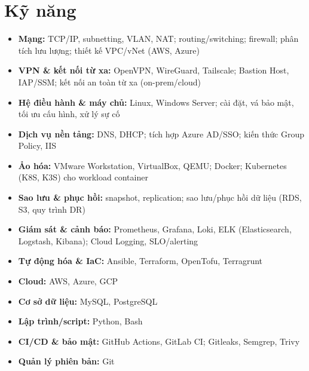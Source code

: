 \documentclass[a4paper,10pt]{article}
\begin{document}
\section*{Kỹ năng}
\begin{itemize}[leftmargin=0.5in]
    \item \textbf{Mạng:} TCP/IP, subnetting, VLAN, NAT; routing/switching; firewall; phân tích lưu lượng; thiết kế VPC/vNet (AWS, Azure)
    \item \textbf{VPN \& kết nối từ xa:} OpenVPN, WireGuard, Tailscale; Bastion Host, IAP/SSM; kết nối an toàn từ xa (on-prem/cloud)
    \item \textbf{Hệ điều hành \& máy chủ:} Linux, Windows Server; cài đặt, vá bảo mật, tối ưu cấu hình, xử lý sự cố
    \item \textbf{Dịch vụ nền tảng:} DNS, DHCP; tích hợp Azure AD/SSO; kiến thức Group Policy, IIS
    \item \textbf{Ảo hóa:} VMware Workstation, VirtualBox, QEMU; Docker; Kubernetes (K8S, K3S) cho workload container
    \item \textbf{Sao lưu \& phục hồi:} snapshot, replication; sao lưu/phục hồi dữ liệu (RDS, S3, quy trình DR)
    \item \textbf{Giám sát \& cảnh báo:} Prometheus, Grafana, Loki, ELK (Elasticsearch, Logstash, Kibana); Cloud Logging, SLO/alerting
    \item \textbf{Tự động hóa \& IaC:} Ansible, Terraform, OpenTofu, Terragrunt
    \item \textbf{Cloud:} AWS, Azure, GCP
    \item \textbf{Cơ sở dữ liệu:} MySQL, PostgreSQL
    \item \textbf{Lập trình/script:} Python, Bash
    \item \textbf{CI/CD \& bảo mật:} GitHub Actions, GitLab CI; Gitleaks, Semgrep, Trivy
    \item \textbf{Quản lý phiên bản:} Git
\end{itemize}

\vspace{10pt}
\end{document}
